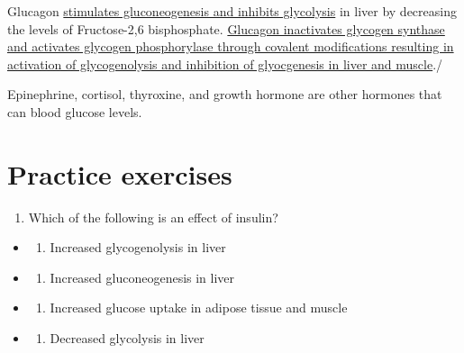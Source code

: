 \documentclass[
]{book}
\providecommand{\tightlist}{%
  \setlength{\itemsep}{0pt}\setlength{\parskip}{0pt}}
\begin{document}
Glucagon \hyperref[regulation-of-glycolysis-and-gluconeogenesis]{stimulates gluconeogenesis and inhibits glycolysis} in liver by decreasing the levels of Fructose-2,6 bisphosphate. \hyperref[hormonal-regulation-of-glycogen-metabolism]{Glucagon inactivates glycogen synthase and activates glycogen phosphorylase through covalent modifications resulting in activation of glycogenolysis and inhibition of glyocgenesis in liver and muscle}./

Epinephrine, cortisol, thyroxine, and growth hormone are other hormones that can blood glucose levels.

\section{Practice exercises}\label{practice-exercises-4}

\begin{enumerate}
\def\labelenumi{\arabic{enumi}.}
\tightlist
\item
  Which of the following is an effect of insulin?
\end{enumerate}

\begin{itemize}
\tightlist
\item
  \begin{enumerate}
  \def\labelenumi{(\Alph{enumi})}
  \tightlist
  \item
    Increased glycogenolysis in liver\\
  \end{enumerate}
\item
  \begin{enumerate}
  \def\labelenumi{(\Alph{enumi})}
  \setcounter{enumi}{1}
  \tightlist
  \item
    Increased gluconeogenesis in liver\\
  \end{enumerate}
\item
  \begin{enumerate}
  \def\labelenumi{(\Alph{enumi})}
  \setcounter{enumi}{2}
  \tightlist
  \item
    Increased glucose uptake in adipose tissue and muscle\\
  \end{enumerate}
\item
  \begin{enumerate}
  \def\labelenumi{(\Alph{enumi})}
  \setcounter{enumi}{3}
  \tightlist
  \item
    Decreased glycolysis in liver
  \end{enumerate}
\end{itemize}
\end{document}
